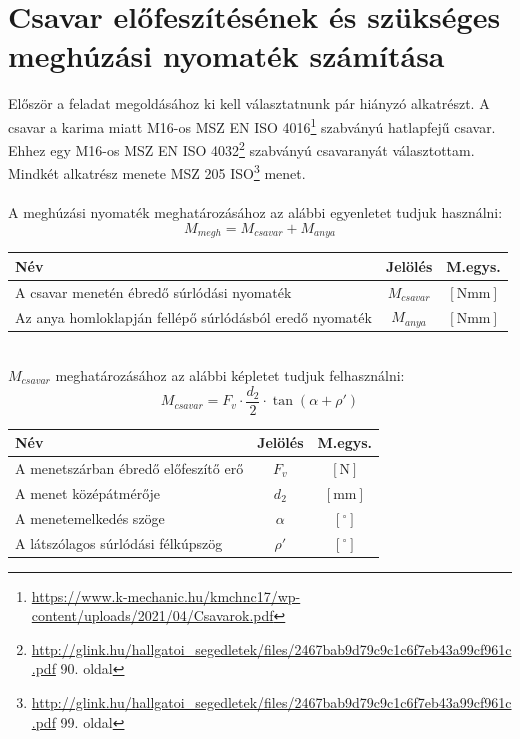 \documentclass[10pt, a4paper]{article}
\newcommand{\n}{\mathrm{\left[N\right]}}
\newcommand{\mm}{\mathrm{\left[mm\right]}}
\newcommand{\nmm}{\mathrm{\left[Nmm\right]}}
\newcommand{\szog}{\mathrm{\left[^{\circ}\right]}}
\begin{document}
	\section{Csavar előfeszítésének és szükséges meghúzási nyomaték számítása}
	Először a feladat megoldásához ki kell választatnunk pár hiányzó alkatrészt. A csavar a karima miatt M16-os MSZ EN ISO 4016\footnote{\url{https://www.k-mechanic.hu/kmchnc17/wp-content/uploads/2021/04/Csavarok.pdf}} szabványú hatlapfejű csavar. Ehhez egy M16-os MSZ EN ISO 4032\footnote{\url{http://glink.hu/hallgatoi_segedletek/files/2467bab9d79c9c1c6f7eb43a99cf961c.pdf} 90. oldal} szabványú csavaranyát választottam. Mindkét alkatrész menete MSZ 205 ISO\footnote{\url{http://glink.hu/hallgatoi_segedletek/files/2467bab9d79c9c1c6f7eb43a99cf961c.pdf} 99. oldal} menet.\\\\
	A meghúzási nyomaték meghatározásához az alábbi egyenletet tudjuk használni:
	\begin{equation}
		M_{megh} = M_{csavar} + M_{anya} \tag{5}
	\end{equation}
	\vspace{-20pt}
	\renewcommand{\arraystretch}{1.4}
					\begin{table}[!h]
						\centering
						\begin{tabular}{l|c|c}
							\textbf{Név}                              & \textbf{Jelölés} & \textbf{M.egys.} \\ \hline
							A csavar menetén ébredő súrlódási nyomaték                      & $M_{csavar}$                & $\nmm$          \\
							Az anya homloklapján fellépő súrlódásból eredő nyomaték           & $M_{anya}$                & $\nmm$			     
						\end{tabular}
					\end{table}
	\renewcommand{\arraystretch}{1}\\
	$M_{csavar}$ meghatározásához az alábbi képletet tudjuk felhasználni:
	\begin{equation}
		M_{csavar} = F_v \cdot \dfrac{d_2}{2} \cdot \tan(\alpha + \rho') \tag{5.1}
	\end{equation}
	\vspace{-25pt}
	\renewcommand{\arraystretch}{1.4}
						\begin{table}[!h]
							\centering
							\begin{tabular}{l|c|c}
								\textbf{Név}                              & \textbf{Jelölés} & \textbf{M.egys.} \\ \hline
								A menetszárban ébredő előfeszítő erő                     & $F_v$                & $\n$          \\
								A menet középátmérője           & $d_2$                & $\mm$			 \\
								A menetemelkedés szöge           & $\alpha$                & $\szog$			 \\
								A látszólagos súrlódási félkúpszög           & $\rho'$                & $\szog$			       
							\end{tabular}
						\end{table}
\end{document}
